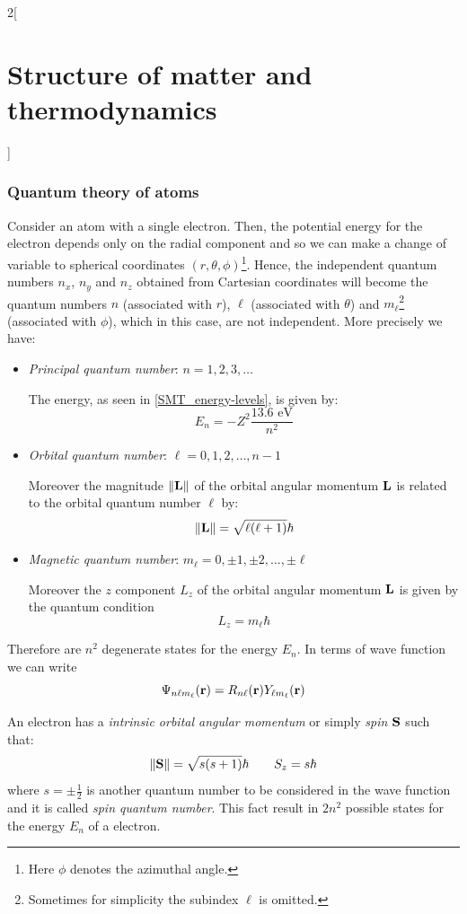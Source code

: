 \documentclass[../../../main.tex]{subfiles}
\begin{document}
\begin{multicols}{2}[\section{Structure of matter and thermodynamics}]
    \subsubsection{Quantum theory of atoms}
    \begin{definition}
        Consider an atom with a single electron. Then, the potential energy for the electron depends only on the radial component and so we can make a change of variable to spherical coordinates $(r,\theta,\phi)$\footnote{Here $\phi$ denotes the azimuthal angle.}. Hence, the independent quantum numbers $n_x$, $n_y$ and $n_z$ obtained from Cartesian coordinates will become the quantum numbers $n$ (associated with $r$), $\ell$ (associated with $\theta$) and $m_\ell$\footnote{Sometimes for simplicity the subindex $\ell$ is omitted.} (associated with $\phi$), which in this case, are not independent. More precisely we have:
        \begin{itemize}
            \item \textit{Principal quantum number}: $n=1,2,3,\ldots$\par
                  The energy, as seen in \cref{SMT_energy-levels}, is given by: $$E_n=-Z^2\frac{13.6\text{ eV}}{n^2}$$
            \item \textit{Orbital quantum number}: $\ell=0,1,2,\ldots,n-1$\par Moreover the magnitude $\|\boldsymbol{\mathrm{L}}\|$ of the orbital angular momentum $\boldsymbol{\mathrm{L}}$ is related to the orbital quantum number $\ell$ by: $$\|\boldsymbol{\mathrm{L}}\|=\sqrt{\ell(\ell+1)}\hbar$$
            \item \textit{Magnetic quantum number}: $m_\ell=0,\pm 1,\pm 2,\ldots,\pm\ell$\par
                  Moreover the $z$ component $L_z$ of the orbital angular momentum $\boldsymbol{\mathrm{L}}$ is given by the quantum condition $$L_z=m_\ell\hbar$$
        \end{itemize}
        Therefore are $n^2$ degenerate states for the energy $E_n$.
        In terms of wave function we can write $$\Psi_{n\ell m_\ell}(\boldsymbol{\mathrm{r}})=R_{n\ell}(\boldsymbol{\mathrm{r}})Y_{\ell m_\ell}(\boldsymbol{\mathrm{r}})$$
    \end{definition}
    \begin{definition}[Spin]
        An electron has a \textit{intrinsic orbital angular momentum} or simply \textit{spin $\boldsymbol{\mathrm{S}}$} such that:
        $$\|\boldsymbol{\mathrm{S}}\|=\sqrt{s(s+1)}\hbar\qquad S_z=s\hbar$$ where $s=\pm\frac{1}{2}$ is another quantum number  to be considered in the wave function and it is called \textit{spin quantum number}. This fact result in $2n^2$ possible states for the energy $E_n$ of a electron.

\end{definition}
\end{multicols}
\end{document}
